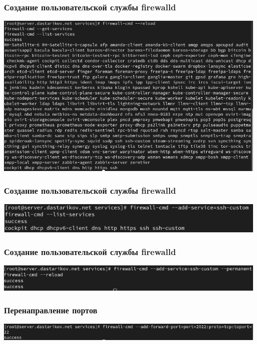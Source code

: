 \begin{frame}
\frametitle{Создание пользовательской службы firewalld}
    \includegraphics[width=\textwidth]{../images/image02.png}
\end{frame}

\begin{frame}
\frametitle{Создание пользовательской службы firewalld}
    \includegraphics[width=\textwidth]{../images/image03.png}
\end{frame}

\begin{frame}
\frametitle{Создание пользовательской службы firewalld}
    \includegraphics[width=\textwidth]{../images/image04.png}
\end{frame}


\begin{frame}
\frametitle{Перенаправление портов}
    \includegraphics[width=\textwidth]{../images/image05.png}
\end{frame}

